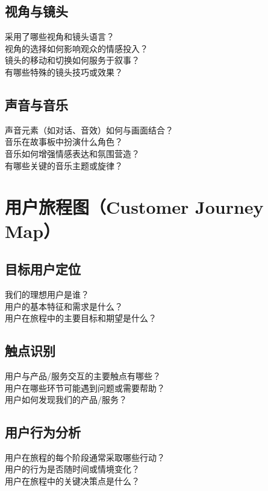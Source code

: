 \documentclass[12pt]{book}
\begin{document}
\subsection{视角与镜头}
采用了哪些视角和镜头语言？\\
视角的选择如何影响观众的情感投入？\\
镜头的移动和切换如何服务于叙事？\\
有哪些特殊的镜头技巧或效果？\\

\subsection{声音与音乐}
声音元素（如对话、音效）如何与画面结合？\\
音乐在故事板中扮演什么角色？\\
音乐如何增强情感表达和氛围营造？\\
有哪些关键的音乐主题或旋律？\\


\section{用户旅程图（Customer Journey Map）}
\subsection{目标用户定位}
我们的理想用户是谁？\\
用户的基本特征和需求是什么？\\
用户在旅程中的主要目标和期望是什么？\\

\subsection{触点识别}
用户与产品/服务交互的主要触点有哪些？\\
用户在哪些环节可能遇到问题或需要帮助？\\
用户如何发现我们的产品/服务？\\

\subsection{用户行为分析}
用户在旅程的每个阶段通常采取哪些行动？\\
用户的行为是否随时间或情境变化？\\
用户在旅程中的关键决策点是什么？\\
\end{document}
